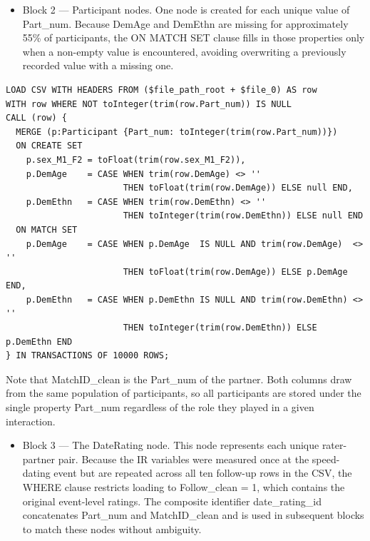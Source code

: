 \documentclass[sn-apa,pdflatex]{sn-jnl}
\theoremstyle{remark}
\theoremstyle{definition}
\providecommand{\tightlist}{%
  \setlength{\itemsep}{0pt}\setlength{\parskip}{0pt}}
\begin{document}
\begin{itemize}
\tightlist
\item
  Block 2 --- Participant nodes. One node is created for each unique
  value of Part\_num. Because DemAge and DemEthn are missing for
  approximately 55\% of participants, the ON MATCH SET clause fills in
  those properties only when a non-empty value is encountered, avoiding
  overwriting a previously recorded value with a missing one.
\end{itemize}

\begin{verbatim}
LOAD CSV WITH HEADERS FROM ($file_path_root + $file_0) AS row
WITH row WHERE NOT toInteger(trim(row.Part_num)) IS NULL
CALL (row) {
  MERGE (p:Participant {Part_num: toInteger(trim(row.Part_num))})
  ON CREATE SET
    p.sex_M1_F2 = toFloat(trim(row.sex_M1_F2)),
    p.DemAge    = CASE WHEN trim(row.DemAge) <> ''
                       THEN toFloat(trim(row.DemAge)) ELSE null END,
    p.DemEthn   = CASE WHEN trim(row.DemEthn) <> ''
                       THEN toInteger(trim(row.DemEthn)) ELSE null END
  ON MATCH SET
    p.DemAge    = CASE WHEN p.DemAge  IS NULL AND trim(row.DemAge)  <> ''
                       THEN toFloat(trim(row.DemAge)) ELSE p.DemAge END,
    p.DemEthn   = CASE WHEN p.DemEthn IS NULL AND trim(row.DemEthn) <> ''
                       THEN toInteger(trim(row.DemEthn)) ELSE p.DemEthn END
} IN TRANSACTIONS OF 10000 ROWS;
\end{verbatim}

Note that MatchID\_clean is the Part\_num of the partner. Both columns
draw from the same population of participants, so all participants are
stored under the single property Part\_num regardless of the role they
played in a given interaction.

\begin{itemize}
\tightlist
\item
  Block 3 --- The DateRating node. This node represents each unique
  rater-partner pair. Because the IR variables were measured once at the
  speed-dating event but are repeated across all ten follow-up rows in
  the CSV, the WHERE clause restricts loading to Follow\_clean = 1,
  which contains the original event-level ratings. The composite
  identifier date\_rating\_id concatenates Part\_num and MatchID\_clean
  and is used in subsequent blocks to match these nodes without
  ambiguity.
\end{itemize}
\end{document}
